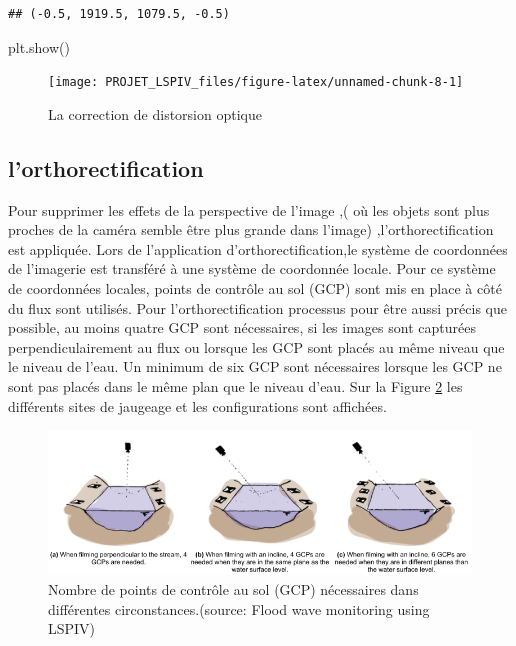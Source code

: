 \documentclass[
]{article}
\newenvironment{Shaded}{\begin{snugshade}}{\end{snugshade}}
\newcommand{\NormalTok}[1]{#1}
\begin{document}
\begin{verbatim}
## (-0.5, 1919.5, 1079.5, -0.5)
\end{verbatim}

\begin{Shaded}
\begin{Highlighting}[]
\NormalTok{plt.show()}
\end{Highlighting}
\end{Shaded}

\begin{figure}[H]
\texttt{[image: PROJET\_LSPIV\_files/figure-latex/unnamed-chunk-8-1]} \caption{La correction de distorsion optique}\label{fig:unnamed-chunk-8}
\end{figure}

\hypertarget{lorthorectification}{%
\subsection*{l'orthorectification}\label{lorthorectification}}

Pour supprimer les effets de la perspective de l'image ,( où les objets sont plus proches
de la caméra semble être plus grande dans l'image) ,l'orthorectification est appliquée.
Lors de l'application d'orthorectification,le système de coordonnées de l'imagerie est transféré à une système de coordonnée locale. Pour ce système de coordonnées locales, points de contrôle au sol (GCP) sont
mis en place à côté du flux sont utilisés. Pour l'orthorectification
processus pour être aussi précis que possible, au moins quatre GCP sont nécessaires, si
les images sont capturées perpendiculairement au flux ou lorsque les GCP
sont placés au même niveau que le niveau de l'eau. Un minimum de six
GCP sont nécessaires lorsque les GCP ne sont pas placés dans le même plan que le
niveau d'eau. Sur la Figure \ref{fig:fortho} les différents sites de jaugeage
et les configurations sont affichées.



\begin{figure}[H]
\includegraphics[width=1\linewidth,]{images/ortho} \caption{Nombre de points de contrôle au sol (GCP) nécessaires dans différentes circonstances.(source: Flood wave monitoring using LSPIV)}\label{fig:fortho}
\end{figure}
\end{document}
